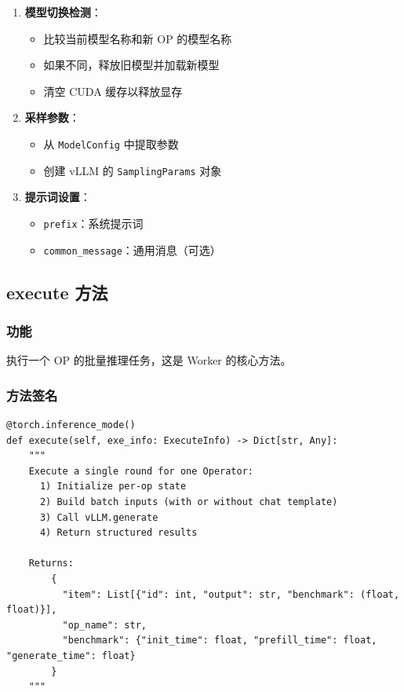 \documentclass[12pt,a4paper]{article}
\begin{document}
\begin{enumerate}
    \item \textbf{模型切换检测}：
    \begin{itemize}
        \item 比较当前模型名称和新 OP 的模型名称
        \item 如果不同，释放旧模型并加载新模型
        \item 清空 CUDA 缓存以释放显存
    \end{itemize}
    
    \item \textbf{采样参数}：
    \begin{itemize}
        \item 从 \texttt{ModelConfig} 中提取参数
        \item 创建 vLLM 的 \texttt{SamplingParams} 对象
    \end{itemize}
    
    \item \textbf{提示词设置}：
    \begin{itemize}
        \item \texttt{prefix}：系统提示词
        \item \texttt{common\_message}：通用消息（可选）
    \end{itemize}
\end{enumerate}

\subsection{execute 方法}

\subsubsection{功能}

执行一个 OP 的批量推理任务，这是 Worker 的核心方法。

\subsubsection{方法签名}

\begin{lstlisting}
@torch.inference_mode()
def execute(self, exe_info: ExecuteInfo) -> Dict[str, Any]:
    """
    Execute a single round for one Operator:
      1) Initialize per-op state
      2) Build batch inputs (with or without chat template)
      3) Call vLLM.generate
      4) Return structured results
    
    Returns:
        {
          "item": List[{"id": int, "output": str, "benchmark": (float, float)}],
          "op_name": str,
          "benchmark": {"init_time": float, "prefill_time": float, "generate_time": float}
        }
    """
\end{lstlisting}
\end{document}
